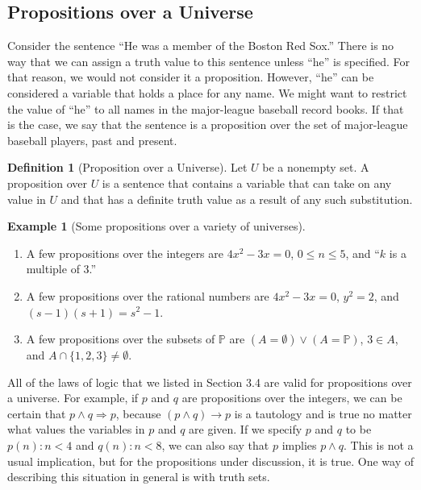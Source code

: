 \documentclass[10pt,]{book}
\theoremstyle{plain}
\theoremstyle{definition}
\newtheorem{definition}[theorem]{Definition}
\theoremstyle{definition}
\theoremstyle{definition}
\newtheorem{example}[theorem]{Example}
\theoremstyle{definition}
\begin{document}
\subsection[Propositions over a Universe]{Propositions over a Universe}\label{ss-propositions-over-a-universe}
Consider the sentence ``He was a member of the Boston Red Sox.'' There is no way that we can assign a truth value to this sentence unless ``he'' is specified. For that reason, we would not consider it a proposition. However, ``he'' can be considered a variable that holds a place for any name. We might want to restrict the value of ``he'' to all names in the major-league baseball record books. If that is the case, we say that the sentence is a proposition over the set of major-league baseball players, past and present.%
\begin{definition}[Proposition over a Universe]\label{def-proposition-over-U}
Let \(U\) be a nonempty set. A proposition over \(U\) is a sentence that contains a variable that can take on any value in \(U\) and that has a definite truth value as a result of any such substitution.%
\end{definition}
\begin{example}[Some propositions over a variety of universes]\label{ex-some-propositions-over-U}

	\leavevmode%
\begin{enumerate}
\item\hypertarget{li-232}{} A few propositions over the integers are \(4x^2 - 3x = 0\),  \(0 \leq  n \leq 5\), and ``\(k\) is a multiple of 3.''%
\item\hypertarget{li-233}{} A few propositions over the rational numbers are \(4x^2 - 3x = 0\),  \(y^2=2\), and  \((s - 1)(s + 1) = s^2 - 1\).%
\item\hypertarget{li-234}{} A few propositions over the subsets of \(\mathbb{P}\) are \((A =\emptyset ) \lor  (A = \mathbb{P} )\), \(3 \in  A\), and  \(A \cap  \{1, 2, 3\}\neq  \emptyset\).%
\end{enumerate}

\end{example}
\par
All of the laws of logic that we listed in Section 3.4 are valid for propositions over a universe. For example, if \(p\) and \(q\) are propositions over the integers, we can be certain that \(p \land  q \Rightarrow  p\), because \((p \land  q) \to  p\) is a tautology and is true no matter what values the variables in \(p\) and \(q\) are given. If we specify \(p\) and \(q\) to be \(p(n) : n < 4\) and \(q(n) : n < 8\), we can also say that \(p\) implies \(p \land  q\). This is not a usual implication, but for the propositions under discussion, it is true. One way of describing this situation in general is with truth sets.%
\typeout{************************************************}
\typeout{************************************************}
\end{document}
